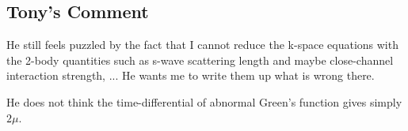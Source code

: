 \subsection{Tony's Comment}
He still feels puzzled by the fact that I cannot reduce the k-space equations with the 2-body quantities such as s-wave scattering length and maybe close-channel interaction strength, ...  He wants me to write them up what is wrong there.  

He does not think the time-differential of abnormal Green's function gives simply $2\mu$. 
